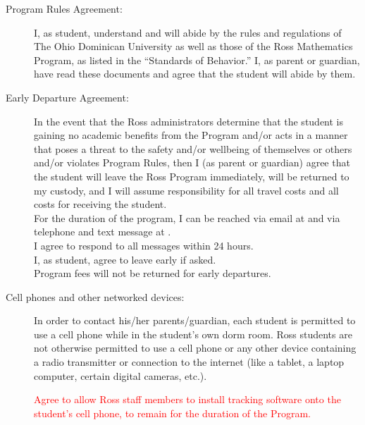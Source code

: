 \documentclass{ross}
\begin{document}
\begin{description}
\item[Program Rules Agreement:] I, as student, understand and will
  abide by the rules and regulations of The Ohio Dominican University as
  well as those of the Ross Mathematics Program, as listed in the
  ``Standards of Behavior.'' I, as parent or guardian, have read
  these documents and agree that the student will abide by them.
\item[Early Departure Agreement:] In the event that the Ross
  administrators determine that the student is gaining no academic
  benefits from the Program and/or acts in a manner that poses a
  threat to the safety and/or wellbeing of themselves or others and/or
  violates Program Rules, then I (as parent or guardian) agree that
  the student will leave the Ross Program immediately, will be
  returned to my custody, and I will assume responsibility for all
  travel costs and all costs for receiving the student. \\
   For the
  duration of the program, I can be reached via email at
   and via telephone and text message at
  . \\[5pt]
   I agree to respond to all messages within 24 hours. \\[1ex]
  I, as student, agree to leave early if asked.  \\
Program fees will not
  be returned for early departures.
\item[Cell phones and other networked devices:]   In 
  order to contact his/her parents/guardian, each student is permitted
  to use a cell phone while in the student's own dorm room. Ross students are not
  otherwise permitted to use a cell phone or any other device containing a radio
  transmitter or connection to the internet (like a tablet, a laptop
  computer, certain digital cameras, etc.).
  
 \textcolor{red}{ Agree to allow Ross staff members to install tracking software 
 onto the student's cell phone, to remain for the duration of the Program.}
 
 \pagebreak 
 

\end{description}
\end{document}
